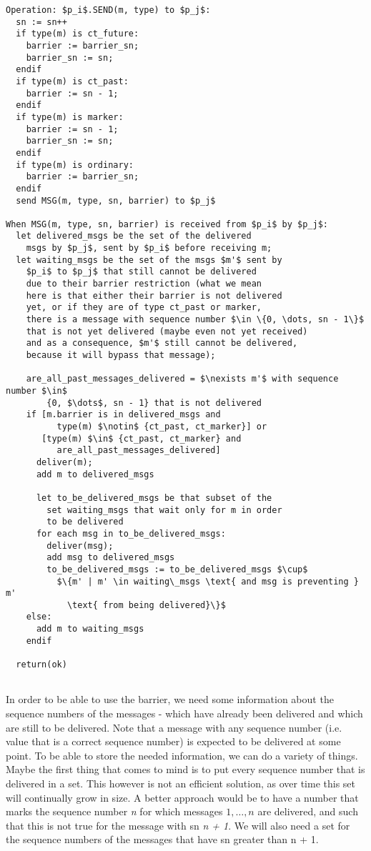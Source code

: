 \documentclass[12pt]{article}
\theoremstyle{plain}
\begin{document}
\clearpage

\begin{lstlisting}[frame=single]
Operation: $p_i$.SEND(m, type) to $p_j$:
  sn := sn++
  if type(m) is ct_future:
    barrier := barrier_sn;
    barrier_sn := sn;
  endif
  if type(m) is ct_past:
    barrier := sn - 1;
  endif
  if type(m) is marker:
    barrier := sn - 1;
    barrier_sn := sn;
  endif
  if type(m) is ordinary:
    barrier := barrier_sn;
  endif
  send MSG(m, type, sn, barrier) to $p_j$

When MSG(m, type, sn, barrier) is received from $p_i$ by $p_j$:
  let delivered_msgs be the set of the delivered 
    msgs by $p_j$, sent by $p_i$ before receiving m;
  let waiting_msgs be the set of the msgs $m'$ sent by
    $p_i$ to $p_j$ that still cannot be delivered
    due to their barrier restriction (what we mean
    here is that either their barrier is not delivered
    yet, or if they are of type ct_past or marker,
    there is a message with sequence number $\in \{0, \dots, sn - 1\}$
    that is not yet delivered (maybe even not yet received)
    and as a consequence, $m'$ still cannot be delivered,
    because it will bypass that message);
    
    are_all_past_messages_delivered = $\nexists m'$ with sequence number $\in$ 
        {0, $\dots$, sn - 1} that is not delivered
    if [m.barrier is in delivered_msgs and
          type(m) $\notin$ {ct_past, ct_marker}] or
       [type(m) $\in$ {ct_past, ct_marker} and
          are_all_past_messages_delivered]
      deliver(m);
      add m to delivered_msgs

      let to_be_delivered_msgs be that subset of the
        set waiting_msgs that wait only for m in order
        to be delivered 
      for each msg in to_be_delivered_msgs:
        deliver(msg);
        add msg to delivered_msgs
        to_be_delivered_msgs := to_be_delivered_msgs $\cup$
          $\{m' | m' \in waiting\_msgs \text{ and msg is preventing } m'
            \text{ from being delivered}\}$
    else:
      add m to waiting_msgs
    endif

  return(ok)
 
\end{lstlisting}

In order to be able to use the barrier, we need some information about the 
sequence numbers of the messages - which have already been delivered and which
are still to be delivered. Note that a message with any sequence number (i.e.
value that is a correct sequence number) is expected to be delivered at some
point. To be able to store the needed information, we can do a variety of things.
Maybe the first thing that comes to mind is to put every sequence number that is
delivered in a set. This however is not an efficient solution, as over time
this set will continually grow in size. A better approach would be to have a
number that marks the sequence number \emph{n} for which messages $1, \dots, n$
are delivered, and such that this is not true for the message with sn
\emph{n + 1}. We will also need a set for the sequence numbers of the messages
that have sn greater than n + 1.  
\end{document}

